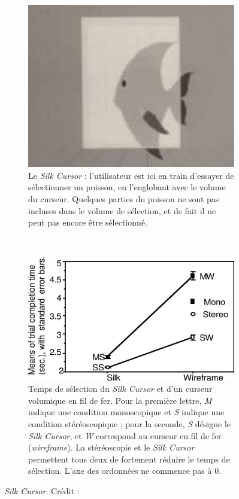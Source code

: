 	\begin{figure}[!htb]
		\begin{subfigure}[t]{0.38\textwidth}
			\centering
			\includegraphics[width=\textwidth]{figures/ch2/silk}
			\caption{Le \emph{Silk Cursor} : l'utilisateur est ici en train d'essayer de sélectionner un poisson, en l'englobant avec le volume du curseur. Quelques parties du poisson ne sont pas incluses dans le volume de sélection, et de fait il ne peut pas encore être sélectionné.}
			\label{fig:silk}
		\end{subfigure}
		~
		\begin{subfigure}[t]{0.60\textwidth}
			\centering
			\includegraphics[width=\textwidth]{figures/ch2/silkPerf}
			\caption{Temps de sélection du \emph{Silk Cursor} et d'un curseur volumique en fil de fer. Pour la première lettre, \emph{M} indique une condition monoscopique et \emph{S} indique une condition stéréoscopique ; pour la seconde, \emph{S} désigne le \emph{Silk Cursor}, et \emph{W} correspond au curseur en fil de fer (\emph{wireframe}). La stéréoscopie et le \emph{Silk Cursor} permettent tous deux de fortement réduire le temps de sélection. L'axe des ordonnées ne commence pas à 0.}
			\label{fig:silkPerf}
		\end{subfigure}
		\caption[\emph{Silk Cursor}]{\emph{Silk Cursor}. Crédit : \cite{zhai1994silk}}
		\label{fig:silkCursorPerf}
	\end{figure}
	
